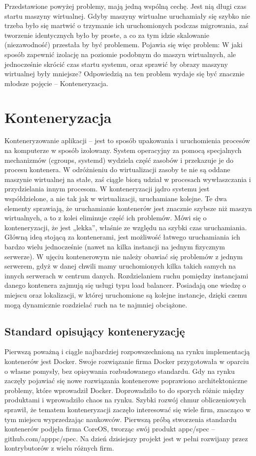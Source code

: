\documentclass[10pt,a4paper,titlepage,twoside]{report}
\begin{document}
\indent \indent Przedstawione powyżej problemy, mają jedną wspólną cechę. Jest nią długi czas startu maszyny wirtualnej. Gdyby maszyny wirtualne uruchamiały się szybko nie trzeba było się martwić o trzymanie ich uruchomionych podczas migrowania, zaś tworzenie identycznych było by proste, a co za tym idzie skalowanie (niezawodność) przestała by być problemem. Pojawia się więc problem: W jaki sposób zapewnić izolację na poziomie podobnym do maszyn wirtualnych, ale jednocześnie skrócić czas startu systemu, oraz sprawić by obrazy maszyny wirtualnej były mniejsze? Odpowiedzią na ten problem wydaje się być znacznie młodsze pojęcie – Konteneryzacja.

\section{Konteneryzacja}
\indent \indent Konteneryzowanie aplikacji – jest to sposób upakowania i uruchomienia procesów na komputerze w sposób izolowany. System operacyjny za pomocą specjalnych mechanizmów (cgroups, systemd) wydziela część zasobów i przekazuje je do procesu kontenera. W odróżnieniu do wirtualizacji zasoby te nie są oddane maszynie wirtualnej na stałe, zaś ciągle biorą udział w procesach wywłaszczania i przydzielania innym procesom. W konteneryzacji jądro systemu jest współdzielone, a nie tak jak w wirtualizacji, uruchamiane kolejne. Te dwa elementy sprawiają, że uruchamianie kontenerów jest znacznie szybsze niż maszyn wirtualnych\cite{ad21}, a to z kolei eliminuje część ich problemów. Mówi się o konteneryzacji, że jest „lekka”, właśnie ze względu na szybki czas uruchamiania. Główną ideą stojącą za kontenerami, jest możliwość łatwego uruchamiania ich bardzo wielu jednocześnie (nawet na kilka instancji na jednym fizycznym serwerze). W ujęciu kontenerowym nie należy obawiać się problemów z jednym serwerem, gdyż w danej chwili mamy uruchomionych kilka takich samych na innych serwerach w centrum danych. Rozdzielaniem ruchu pomiędzy instancjami danego kontenera zajmują się usługi typu load balancer. Posiadają one wiedzę o miejscu oraz lokalizacji, w której uruchomione są kolejne instancje, dzięki czemu mogą dynamicznie rozdzielać ruch na te najmniej obciążone.

\subsection{Standard opisujący konteneryzację}\indent \indent
Pierwszą poważną i ciągle najbardziej rozpowszechnioną na rynku implementacją kontenerów jest Docker\cite{ad22}. Swoje rozwiązanie firma Docker przygotowała w oparciu o własne pomysły, bez opisywania rozbudowanego standardu. Gdy na rynku zaczęły pojawiać się nowe rozwiązania kontenerowe poprawiono architektoniczne problemy, które wprowadził Docker. Doprowadziło to do sporych różnic między produktami i wprowadziło chaos na rynku. Szybki rozwój chmur obliczeniowych sprawił, że tematem konteneryzacji zaczęło interesować się wiele firm, znacząco w tym miejscu wyprzedzając naukowców. Pierwszą próbą stworzenia standardu kontenerów podjęła firma CoreOS, tworząc swój produkt appc/spec – github.com/apppc/spec. Na dzień dzisiejszy projekt jest w pełni rozwijany przez kontrybutorów z wielu różnych firm.
\end{document}
